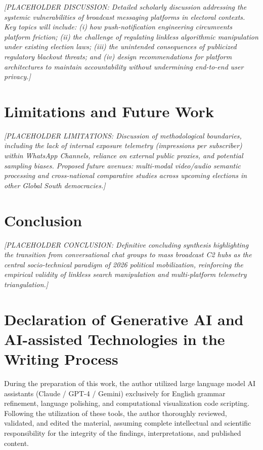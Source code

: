 \documentclass[preprint,12pt]{elsarticle}
\begin{document}
\noindent \textit{[PLACEHOLDER DISCUSSION: Detailed scholarly discussion addressing the systemic vulnerabilities of broadcast messaging platforms in electoral contexts. Key topics will include: (i) how push-notification engineering circumvents platform friction; (ii) the challenge of regulating linkless algorithmic manipulation under existing election laws; (iii) the unintended consequences of publicized regulatory blackout threats; and (iv) design recommendations for platform architectures to maintain accountability without undermining end-to-end user privacy.]}

\section{Limitations and Future Work}\label{sec:limitations}

\noindent \textit{[PLACEHOLDER LIMITATIONS: Discussion of methodological boundaries, including the lack of internal exposure telemetry (impressions per subscriber) within WhatsApp Channels, reliance on external public proxies, and potential sampling biases. Proposed future avenues: multi-modal video/audio semantic processing and cross-national comparative studies across upcoming elections in other Global South democracies.]}

\section{Conclusion}\label{sec:conclusion}

\noindent \textit{[PLACEHOLDER CONCLUSION: Definitive concluding synthesis highlighting the transition from conversational chat groups to mass broadcast C2 hubs as the central socio-technical paradigm of 2026 political mobilization, reinforcing the empirical validity of linkless search manipulation and multi-platform telemetry triangulation.]}

\section*{Declaration of Generative AI and AI-assisted Technologies in the Writing Process}
During the preparation of this work, the author utilized large language model AI assistants (Claude / GPT-4 / Gemini) exclusively for English grammar refinement, language polishing, and computational visualization code scripting. Following the utilization of these tools, the author thoroughly reviewed, validated, and edited the material, assuming complete intellectual and scientific responsibility for the integrity of the findings, interpretations, and published content.
\end{document}
